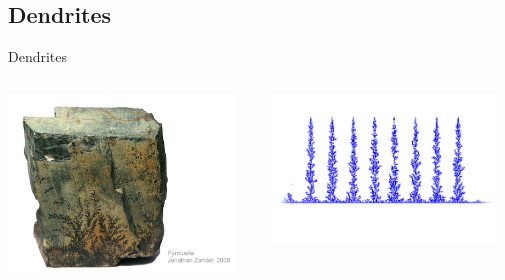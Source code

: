 \documentclass[smaller]{beamer}
\begin{document}
        \subsection{Dendrites}
            \begin{frame}{Dendrites}
               \begin{columns}
                    \begin{column}{6cm}
                        \includegraphics[width=6cm]{img/dendrite_01.png}
                    \end{column}
                    \begin{column}{6cm}
                        \includegraphics[width=6cm]{img/dendrite_02.png}
                    \end{column}
               \end{columns} 
            \end{frame}
\end{document}
